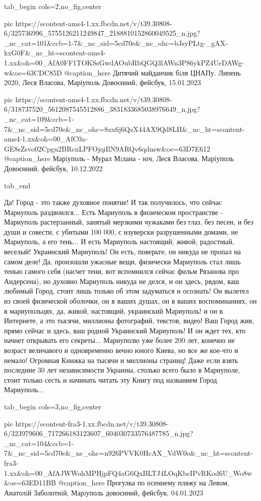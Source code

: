 \ifcmt
  tab_begin cols=2,no_fig,center

     pic https://scontent-ams4-1.xx.fbcdn.net/v/t39.30808-6/325736996_5755126211249847_2188810152860049525_n.jpg?_nc_cat=101&ccb=1-7&_nc_sid=5cd70e&_nc_ohc=bJsyPLtg-_gAX-kxG0F&_nc_ht=scontent-ams4-1.xx&oh=00_AfA0FF1TOKSsGwdAOubRbQGQ3lAWn3P86ykPZ4UeDAWg-w&oe=63CDC85D
     @caption_here Дитячий майданчик бiля ЦНАПу. Липень 2020, Леся Власова, Маріуполь Довоєнний, фейсбук, 15.01.2023

     pic https://scontent-ams4-1.xx.fbcdn.net/v/t39.30808-6/318737520_5612087545512886_3831833685038976649_n.jpg?_nc_cat=109&ccb=1-7&_nc_sid=5cd70e&_nc_ohc=8xx6j6QzX44AX9Qd8LH&_nc_ht=scontent-ams4-1.xx&oh=00_AfC0a-GE8sZsvo02Cpgu2BRcnLPFOjqiIlN9ARQv6qdnsw&oe=63D7E612
     @caption_here Марiуполь - Мурал Мiлана - нiч, Леся Власова, Маріуполь Довоєнний, фейсбук, 10.12.2022

  tab_end
\fi

Да! Город - это также
духовное понятие!  И так получилось, что сейчас Мариуполь раздвоился...  Есть
Мариуполь в физическом пространстве - Мариуполь растерзанный, занятый мерзкими
чужаками без глаз, без песен, и без души и совести, с убитыми 100 000, с
изуверски разрушенными домами, не Мариуполь, а его тень... И есть Мариуполь
настоящий, живой, радостный, веселый!  Украинский Мариуполь!  Он есть,
поверьте, он никуда не пропал на самом деле!  Да, произошли ужасные вещи,
физически Мариуполь стал лишь тенью самого себя (насчет тени, вот вспомнился
сейчас фильм Рязанова про Андерсена), но духовно Мариуполь никуда не делся, и
он здесь, рядом, ваш любимый Город, стоит лишь только об этом задуматься и
осознать!  Он вылетел из своей физической оболочки, он в ваших душах, он в
ваших воспоминаниях, он в мариупольцях, да, живой, настоящий, украинский
Мариуполь!  и он в Интернете, а это тысячи, миллионы фотографий, текстов,
видео! Ваш Город жив, прямо сейчас и здесь, ваш родной Украинский Мариуполь!  И
он ждет тех, кто начнет открывать его секреты... Мариуполю уже более 200 лет,
конечно не возраст величавого и одновременно вечно юного Киева, но все же кое-что и немало!
Огромная Книжка на тысячи и миллионы страниц! Даже если взять последние 30 лет
независимости Украины, столько всего было в Мариуполе, стоит только сесть и
начинать читать эту Книгу под названием Город Мариуполь...

\ifcmt
  tab_begin cols=3,no_fig,center

     pic https://scontent-fra3-1.xx.fbcdn.net/v/t39.30808-6/323979606_717266183123607_604030733576487785_n.jpg?_nc_cat=104&ccb=1-7&_nc_sid=5cd70e&_nc_ohc=n926PVVK0HcAX_VdW0o&_nc_ht=scontent-fra3-1.xx&oh=00_AfAJWWohMPHjpFQ4aG6QxBLTJ4LOqKbcIPvRKod6U_Wo8w&oe=63ED11BB
     @caption_here Прогулка по осеннему пляжу на Левом, Анатолiй Заболотнiй, Марiуполь довоєнний, фейсбук, 04.01.2023 

